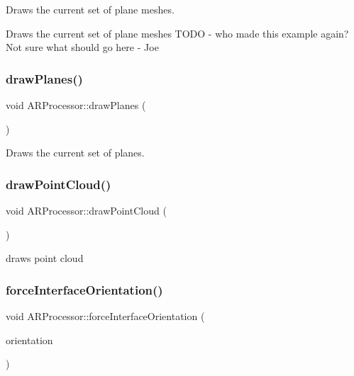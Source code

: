 Draws the current set of plane meshes. 

Draws the current set of plane meshes T\+O\+DO -\/ who made this example again? Not sure what should go here -\/ Joe \mbox{\label{class_a_r_processor_acb7b24b21a47b4f4aa9d4d2c07a60d56}} 
\subsubsection{\texorpdfstring{draw\+Planes()}{drawPlanes()}}
{\footnotesize\ttfamily void A\+R\+Processor\+::draw\+Planes (\begin{DoxyParamCaption}{ }\end{DoxyParamCaption})}



Draws the current set of planes. 

\mbox{\label{class_a_r_processor_ae938bf188d56d8b30b141b2fa23e96f8}} 
\subsubsection{\texorpdfstring{draw\+Point\+Cloud()}{drawPointCloud()}}
{\footnotesize\ttfamily void A\+R\+Processor\+::draw\+Point\+Cloud (\begin{DoxyParamCaption}{ }\end{DoxyParamCaption})}



draws point cloud 

\mbox{\label{class_a_r_processor_a1100d09ed407ae8d1f4e95a9698e548d}} 
\subsubsection{\texorpdfstring{force\+Interface\+Orientation()}{forceInterfaceOrientation()}}
{\footnotesize\ttfamily void A\+R\+Processor\+::force\+Interface\+Orientation (\begin{DoxyParamCaption}\item[{U\+I\+Interface\+Orientation}]{orientation }\end{DoxyParamCaption})}

